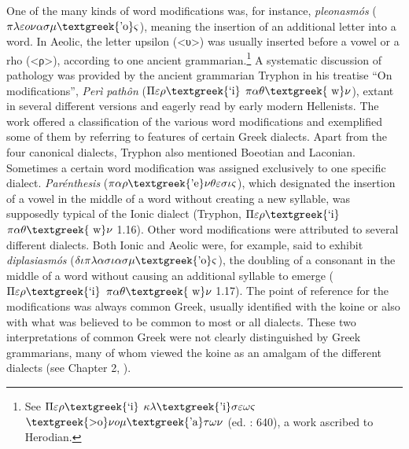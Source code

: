 \documentclass[output=paper]{langsci/langscibook}
\begin{document}
\begin{styleCatalogusnotities}
One of the many kinds of word modifications was, for instance, \textit{pleonasmós} ($\pi \lambda \varepsilon o\nu \alpha \sigma \mu \text{\textgreek{'o}}\varsigma $), meaning the insertion of an additional letter into a word. In Aeolic, the letter upsilon (<υ>) was usually inserted before a vowel or a rho (<ρ>), according to one ancient grammarian.\footnote{ \textrm{See $\Pi \varepsilon \rho \text{\textgreek{`i}}$ $\kappa \lambda \text{\textgreek{'i}}\sigma \varepsilon \omega \varsigma $ $\text{\textgreek{>o}}\nu o\mu \text{\textgreek{'a}}\tau \omega \nu $ (ed. \citealt{Lentz1870}: 640), a work ascribed to Herodian.}} A systematic discussion of pathology was provided by the ancient grammarian Tryphon in his treatise “On modifications”, \textit{Perì} \textit{pathôn} ($\Pi \varepsilon \rho \text{\textgreek{`i}}$ $\pi \alpha \theta \text{\textgreek{~w}}\nu $), extant in several different versions and eagerly read by early modern Hellenists. The work offered a classification of the various word modifications and exemplified some of them by referring to features of certain Greek dialects. Apart from the four canonical dialects, Tryphon also mentioned Boeotian and Laconian. Sometimes a certain word modification was assigned exclusively to one specific dialect. \textit{Parénthesis} ($\pi \alpha \rho \text{\textgreek{'e}}\nu \theta \varepsilon \sigma \iota \varsigma $), which designated the insertion of a vowel in the middle of a word without creating a new syllable, was supposedly typical of the Ionic dialect (Tryphon, $\Pi \varepsilon \rho \text{\textgreek{`i}}$ $\pi \alpha \theta \text{\textgreek{~w}}\nu $ 1.16). Other word modifications were attributed to several different dialects. Both Ionic and Aeolic were, for example, said to exhibit \textit{diplasiasmós} ($\delta \iota \pi \lambda \alpha \sigma \iota \alpha \sigma \mu \text{\textgreek{'o}}\varsigma $), the doubling of a consonant in the middle of a word without causing an additional syllable to emerge ($\Pi \varepsilon \rho \text{\textgreek{`i}}$ $\pi \alpha \theta \text{\textgreek{~w}}\nu $ 1.17). The point of reference for the modifications was always common Greek, usually identified with the koine or also with what was believed to be common to most or all dialects. These two interpretations of common Greek were not clearly distinguished by Greek grammarians, many of whom viewed the koine as an amalgam of the different dialects (see Chapter 2, ).
\end{styleCatalogusnotities}
\end{document}
